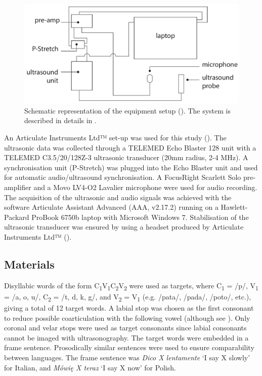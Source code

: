 \documentclass[authoryear, 5p]{elsarticle}
\begin{document}
\label{s:equipment}

\begin{figure}
    \centering
    \includegraphics[width=.7\textwidth]{../../graphics/uti-setup.pdf}
    \caption{Schematic representation of the equipment setup (\citealt{articulate2011}). The system is described in details in .}
    \label{f:uti-setup}
\end{figure}

An Articulate Instruments Ltd™ set-up was used for this study
(). The ultrasonic data was collected through a
TELEMED Echo Blaster 128 unit with a TELEMED C3.5/20/128Z-3 ultrasonic
transducer (20mm radius, 2-4 MHz). A synchronisation unit (P-Stretch)
was plugged into the Echo Blaster unit and used for automatic
audio/ultrasound synchronisation. A FocusRight Scarlett Solo
pre-amplifier and a Movo LV4-O2 Lavalier microphone were used for audio
recording. The acquisition of the ultrasonic and audio signals was
achieved with the software Articulate Assistant Advanced (AAA, v2.17.2)
running on a Hawlett-Packard ProBook 6750b laptop with Microsoft Windows
7. Stabilisation of the ultrasonic transducer was ensured by using a
headset produced by Articulate Instruments Ltd™
(\citeyear{articulate2008}).

\subsection{Materials}\label{materials}

Disyllabic words of the form
C\textsubscript{1}V\textsubscript{1}C\textsubscript{2}V\textsubscript{2}
were used as targets, where C\textsubscript{1} = /p/, V\textsubscript{1}
= /a, o, u/, C\textsubscript{2} = /t, d, k, g/, and V\textsubscript{2} =
V\textsubscript{1} (e.g. /pata/, /pada/, /poto/, etc.), giving a total
of 12 target words. A labial stop was chosen as the first consonant to
reduce possible coarticulation with the following vowel (although see
\citealt{vazquez-alvarez2007}). Only coronal and velar stops were used
as target consonants since labial consonants cannot be imaged with
ultrasonography. The target words were embedded in a frame sentence.
Prosodically similar sentences were used to ensure comparability between
languages. The frame sentence was \emph{Dico X lentamente} `I say X
slowly' for Italian, and \emph{Mówię X teraz} `I say X now' for Polish.
\end{document}
